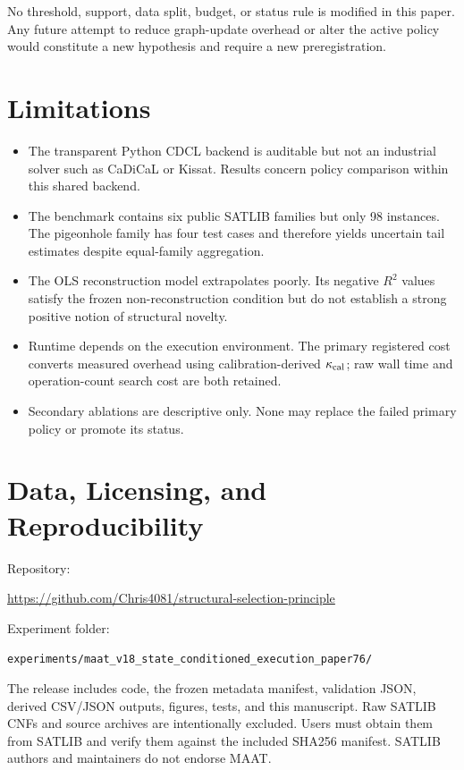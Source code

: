 \documentclass[11pt,a4paper]{article}
\begin{document}
No threshold, support, data split, budget, or status rule is modified in this
paper.  Any future attempt to reduce graph-update overhead or alter the active
policy would constitute a new hypothesis and require a new preregistration.

\section{Limitations}

\begin{itemize}[leftmargin=1.5em]
\item The transparent Python CDCL backend is auditable but not an industrial
solver such as CaDiCaL or Kissat.  Results concern policy comparison within this
shared backend.
\item The benchmark contains six public SATLIB families but only 98 instances.
The pigeonhole family has four test cases and therefore yields uncertain tail
estimates despite equal-family aggregation.
\item The OLS reconstruction model extrapolates poorly.  Its negative $R^2$
values satisfy the frozen non-reconstruction condition but do not establish a
strong positive notion of structural novelty.
\item Runtime depends on the execution environment.  The primary registered
cost converts measured overhead using calibration-derived $\kappa_{\rm cal}$;
raw wall time and operation-count search cost are both retained.
\item Secondary ablations are descriptive only.  None may replace the failed
primary policy or promote its status.
\end{itemize}

\section{Data, Licensing, and Reproducibility}

Repository:
\begin{center}
\url{https://github.com/Chris4081/structural-selection-principle}
\end{center}
Experiment folder:
\begin{center}
\texttt{experiments/maat\_v18\_state\_conditioned\_execution\_paper76/}
\end{center}
The release includes code, the frozen metadata manifest, validation JSON,
derived CSV/JSON outputs, figures, tests, and this manuscript.  Raw SATLIB CNFs
and source archives are intentionally excluded.  Users must obtain them from
SATLIB and verify them against the included SHA256 manifest.  SATLIB authors
and maintainers do not endorse MAAT.
\end{document}
